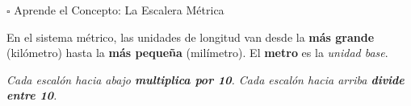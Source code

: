\documentclass[12pt, letterpaper]{article}
\begin{document}
\begin{concepto}{$\square$ Aprende el Concepto: La Escalera Métrica}

En el sistema métrico, las unidades de longitud van desde la
\textbf{más grande} (kilómetro) hasta la \textbf{más pequeña}
(milímetro). El \textbf{metro} es la \textit{unidad base}.

\vspace{6pt}
\textit{Cada escalón hacia abajo \textbf{multiplica por 10}.
Cada escalón hacia arriba \textbf{divide entre 10}.}
\end{concepto}

\vspace{4pt}

%
%
\end{document}
